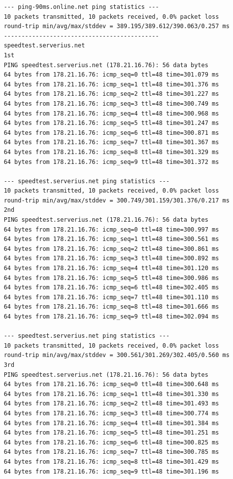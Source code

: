 \documentclass[paper=a4, fontsize=10pt]{scrartcl} %
\numberwithin{equation}{section} %
\numberwithin{figure}{section} %
\numberwithin{table}{section} %
\begin{document}
\begin{lstlisting}
    --- ping-90ms.online.net ping statistics ---
    10 packets transmitted, 10 packets received, 0.0% packet loss
    round-trip min/avg/max/stddev = 389.195/389.612/390.063/0.257 ms
    --------------------------------------------
    speedtest.serverius.net
    1st
    PING speedtest.serverius.net (178.21.16.76): 56 data bytes
    64 bytes from 178.21.16.76: icmp_seq=0 ttl=48 time=301.079 ms
    64 bytes from 178.21.16.76: icmp_seq=1 ttl=48 time=301.376 ms
    64 bytes from 178.21.16.76: icmp_seq=2 ttl=48 time=301.227 ms
    64 bytes from 178.21.16.76: icmp_seq=3 ttl=48 time=300.749 ms
    64 bytes from 178.21.16.76: icmp_seq=4 ttl=48 time=300.968 ms
    64 bytes from 178.21.16.76: icmp_seq=5 ttl=48 time=301.247 ms
    64 bytes from 178.21.16.76: icmp_seq=6 ttl=48 time=300.871 ms
    64 bytes from 178.21.16.76: icmp_seq=7 ttl=48 time=301.367 ms
    64 bytes from 178.21.16.76: icmp_seq=8 ttl=48 time=301.329 ms
    64 bytes from 178.21.16.76: icmp_seq=9 ttl=48 time=301.372 ms
    
    --- speedtest.serverius.net ping statistics ---
    10 packets transmitted, 10 packets received, 0.0% packet loss
    round-trip min/avg/max/stddev = 300.749/301.159/301.376/0.217 ms
    2nd
    PING speedtest.serverius.net (178.21.16.76): 56 data bytes
    64 bytes from 178.21.16.76: icmp_seq=0 ttl=48 time=300.997 ms
    64 bytes from 178.21.16.76: icmp_seq=1 ttl=48 time=300.561 ms
    64 bytes from 178.21.16.76: icmp_seq=2 ttl=48 time=300.861 ms
    64 bytes from 178.21.16.76: icmp_seq=3 ttl=48 time=300.892 ms
    64 bytes from 178.21.16.76: icmp_seq=4 ttl=48 time=301.120 ms
    64 bytes from 178.21.16.76: icmp_seq=5 ttl=48 time=300.986 ms
    64 bytes from 178.21.16.76: icmp_seq=6 ttl=48 time=302.405 ms
    64 bytes from 178.21.16.76: icmp_seq=7 ttl=48 time=301.110 ms
    64 bytes from 178.21.16.76: icmp_seq=8 ttl=48 time=301.666 ms
    64 bytes from 178.21.16.76: icmp_seq=9 ttl=48 time=302.094 ms
    
    --- speedtest.serverius.net ping statistics ---
    10 packets transmitted, 10 packets received, 0.0% packet loss
    round-trip min/avg/max/stddev = 300.561/301.269/302.405/0.560 ms
    3rd
    PING speedtest.serverius.net (178.21.16.76): 56 data bytes
    64 bytes from 178.21.16.76: icmp_seq=0 ttl=48 time=300.648 ms
    64 bytes from 178.21.16.76: icmp_seq=1 ttl=48 time=301.330 ms
    64 bytes from 178.21.16.76: icmp_seq=2 ttl=48 time=301.493 ms
    64 bytes from 178.21.16.76: icmp_seq=3 ttl=48 time=300.774 ms
    64 bytes from 178.21.16.76: icmp_seq=4 ttl=48 time=301.384 ms
    64 bytes from 178.21.16.76: icmp_seq=5 ttl=48 time=301.251 ms
    64 bytes from 178.21.16.76: icmp_seq=6 ttl=48 time=300.825 ms
    64 bytes from 178.21.16.76: icmp_seq=7 ttl=48 time=300.785 ms
    64 bytes from 178.21.16.76: icmp_seq=8 ttl=48 time=301.429 ms
    64 bytes from 178.21.16.76: icmp_seq=9 ttl=48 time=301.196 ms
    

\end{lstlisting}
\end{document}
